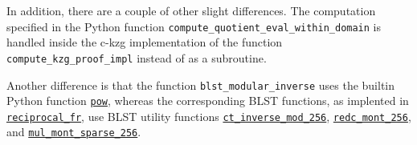 \documentclass[12pt]{galois-whitepaper}
\begin{document}
In addition, there are a couple of other slight differences. The computation specified in the Python function 
\texttt{compute\_quotient\_eval\_within\_domain} is handled inside the c-kzg implementation of the 
function \texttt{compute\_kzg\_proof\_impl} instead of as a subroutine.

Another difference is that the function \texttt{blst\_modular\_inverse} uses the builtin Python function 
\href{https://docs.python.org/3/library/functions.html#pow}{\texttt{pow}}, whereas the corresponding BLST functions, as implented in 
\href{https://github.com/supranational/blst/blob/415d4f0e2347a794091836a3065206edfd9c72f3/src/recip.c#L122}{\texttt{reciprocal\_fr}}, 
use BLST utility functions \href{https://github.com/supranational/blst/blob/master/src/vect.h#L142}{\texttt{ct\_inverse\_mod\_256}}, 
\href{https://github.com/supranational/blst/blob/415d4f0e2347a794091836a3065206edfd9c72f3/src/recip.c#L131}{\texttt{redc\_mont\_256}}, and 
\href{https://github.com/supranational/blst/blob/415d4f0e2347a794091836a3065206edfd9c72f3/src/recip.c#L132}{\texttt{mul\_mont\_sparse\_256}}.

\newpage
\end{document}
